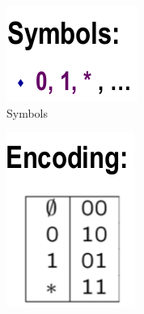 \begin{figure}[H]
	\centering
	\begin{subfigure}[b]{0.15\textwidth}
		\includegraphics[width=\textwidth]{./Cap6/Images/Image13.png}
		\caption{Symbols}
		\label{fig:symbols}
	\end{subfigure}
	\quad
	\quad
	\quad
	\begin{subfigure}[b]{0.15\textwidth}
		\includegraphics[width=\textwidth]{./Cap6/Images/Image14.png}

\end{subfigure}
\end{figure}
